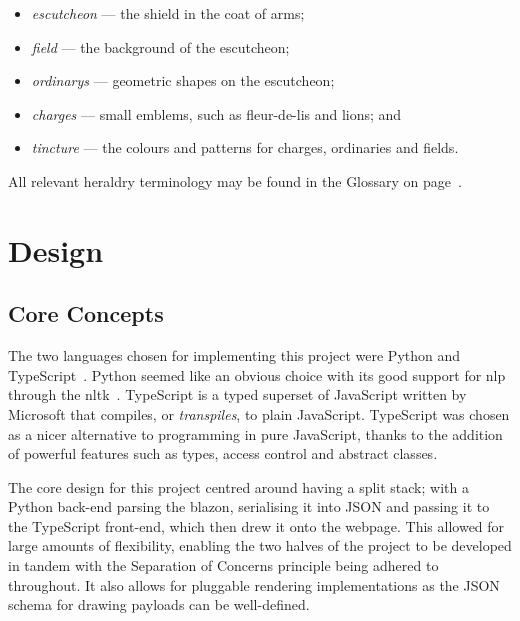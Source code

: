 \documentclass[nobib, a4paper, twoside, justified]{tufte-book}
\makeatletter
\newcommand{\charges}{\glspl{charge}\@\xspace}
\newcommand{\blazon}{\gls{blazon}\@\xspace}
\newcommand{\payloads}{\glspl{payload}\@\xspace}
\makeatother
\begin{document}
\begin{itemize}
  \item \textit{\Gls{escutcheon}} --- the shield in the coat of arms;
  \item \textit{\Gls{field}} --- the background of the escutcheon;
  \item \textit{\Glspl{ordinary}} --- geometric shapes on the escutcheon;
  \item \textit{\Glspl{charge}} --- small emblems, such as fleur-de-lis and lions; and
  \item \textit{\Gls{tincture}} --- the colours and patterns for \charges{}, ordinaries and fields.
\end{itemize}

All relevant heraldry terminology may be found in the Glossary on page~\pageref{glossary}.

\chapter{Design}%
\label{cha:design}

\section{Core Concepts}%
\label{sec:core_concepts}

The two languages chosen for implementing this project were Python and
TypeScript~\autocite{typescript}. Python seemed like an obvious choice with its good support for
\gls{nlp} through the \gls{nltk}~\autocite{bird2004nltk}. TypeScript is a typed superset of
JavaScript written by Microsoft that compiles, or \textit{\glspl{transpile}}, to plain JavaScript.
TypeScript was chosen as a nicer alternative to programming in pure JavaScript, thanks to the
addition of powerful features such as types, access control and abstract classes.

The core design for this project centred around having a split stack; with a Python back-end
parsing the \blazon, serialising it into JSON  and passing it to the TypeScript front-end, which then drew it
onto the webpage. This allowed for large amounts of flexibility, enabling the two halves of the
project to be developed in tandem with the Separation of Concerns principle being adhered to
throughout. It also allows for pluggable rendering implementations as the JSON schema for drawing
\payloads can be well-defined.
\end{document}
